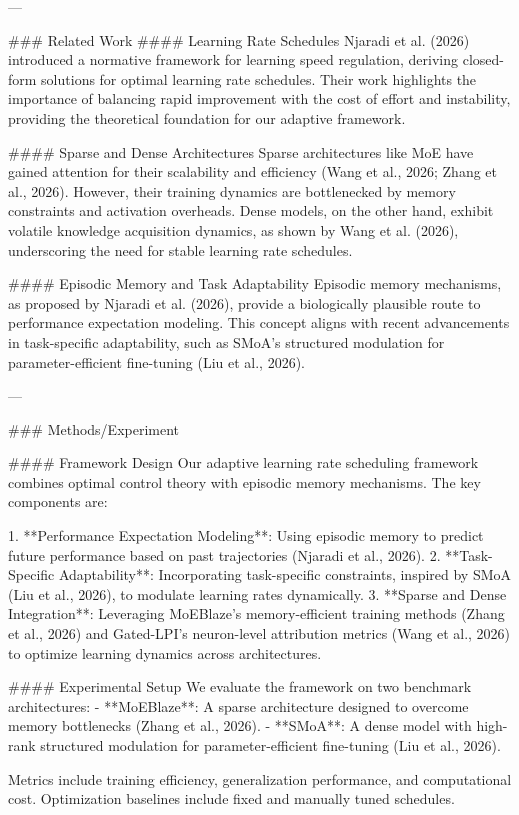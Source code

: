 ---

### Related Work  
#### Learning Rate Schedules  
Njaradi et al. (2026) introduced a normative framework for learning speed regulation, deriving closed-form solutions for optimal learning rate schedules. Their work highlights the importance of balancing rapid improvement with the cost of effort and instability, providing the theoretical foundation for our adaptive framework.

#### Sparse and Dense Architectures  
Sparse architectures like MoE have gained attention for their scalability and efficiency (Wang et al., 2026; Zhang et al., 2026). However, their training dynamics are bottlenecked by memory constraints and activation overheads. Dense models, on the other hand, exhibit volatile knowledge acquisition dynamics, as shown by Wang et al. (2026), underscoring the need for stable learning rate schedules.

#### Episodic Memory and Task Adaptability  
Episodic memory mechanisms, as proposed by Njaradi et al. (2026), provide a biologically plausible route to performance expectation modeling. This concept aligns with recent advancements in task-specific adaptability, such as SMoA's structured modulation for parameter-efficient fine-tuning (Liu et al., 2026).

---

### Methods/Experiment  

#### Framework Design  
Our adaptive learning rate scheduling framework combines optimal control theory with episodic memory mechanisms. The key components are:

1. **Performance Expectation Modeling**: Using episodic memory to predict future performance based on past trajectories (Njaradi et al., 2026).  
2. **Task-Specific Adaptability**: Incorporating task-specific constraints, inspired by SMoA (Liu et al., 2026), to modulate learning rates dynamically.  
3. **Sparse and Dense Integration**: Leveraging MoEBlaze's memory-efficient training methods (Zhang et al., 2026) and Gated-LPI's neuron-level attribution metrics (Wang et al., 2026) to optimize learning dynamics across architectures.  

#### Experimental Setup  
We evaluate the framework on two benchmark architectures:  
- **MoEBlaze**: A sparse architecture designed to overcome memory bottlenecks (Zhang et al., 2026).  
- **SMoA**: A dense model with high-rank structured modulation for parameter-efficient fine-tuning (Liu et al., 2026).  

Metrics include training efficiency, generalization performance, and computational cost. Optimization baselines include fixed and manually tuned schedules.

